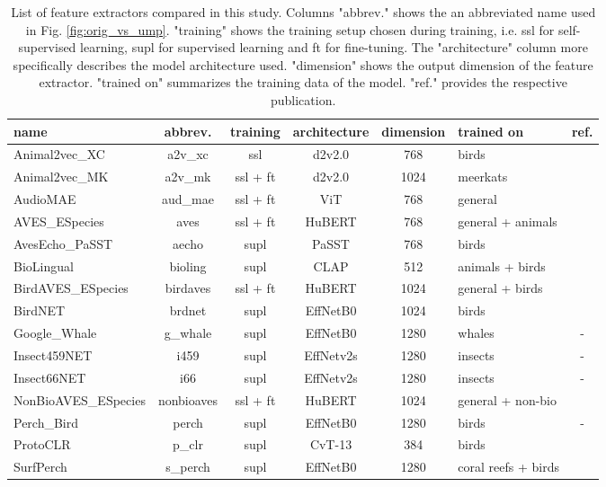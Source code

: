 
\begin{table*}[t]
  
  \caption{List of feature extractors compared in this study. Columns "abbrev." shows the an abbreviated name used in Fig. \ref{fig:orig_vs_ump}. "training" shows the training setup chosen during training, i.e. ssl for self-supervised learning, supl for supervised learning and ft for fine-tuning. The "architecture" column more specifically describes the model architecture used. "dimension" shows the output dimension of the feature extractor. "trained on" summarizes the training data of the model. "ref." provides the respective publication.}
  \label{tab:bacpipe_models}

  \centering
  \begin{tabular}{l|c|c|c|c|l|c}
     \hline
    name& abbrev. & 
    training & architecture &
    dimension & trained on & ref.\\
    \hline
    Animal2vec\_XC      & a2v\_xc   & ssl & d2v2.0 & 768 & birds & \cite{schafer-zimmermann_animal2vec_2024}\\
    Animal2vec\_MK      & a2v\_mk  & ssl + ft & d2v2.0 & 1024& meerkats & \cite{schafer-zimmermann_animal2vec_2024}\\
    AudioMAE            & aud\_mae  & ssl + ft & ViT 	 & 768 & general & \cite{huang_masked_2022}\\
    AVES\_ESpecies      & aves   & ssl + ft & HuBERT 	 & 768 & general + animals & \cite{hagiwara_aves_2022}\\
    AvesEcho\_PaSST     & aecho   & supl & PaSST 	 & 768 & birds & \cite{ghani_generalization_2024}\\
    BioLingual          & bioling  & supl & CLAP 	 & 512 & animals + birds & \cite{robinson_transferable_2023}\\
    BirdAVES\_ESpecies  & birdaves   & ssl + ft & HuBERT 	 & 1024& general + birds & \cite{hagiwara_aves_2022}\\
    BirdNET             & brdnet   & supl & EffNetB0 	 & 1024& birds & \cite{kahl_birdnet_2021}\\
    Google\_Whale       &  g\_whale  & supl & EffNetB0 	 & 1280& whales & - \\
    Insect459NET        & i459 & supl & EffNetv2s 	 & 1280& insects & - \\
    Insect66NET         & i66 & supl & EffNetv2s 	 & 1280& insects & - \\
    NonBioAVES\_ESpecies& nonbioaves    & ssl + ft & HuBERT 	 & 1024& general + non-bio & \cite{hagiwara_aves_2022}\\
    Perch\_Bird         & perch    & supl & EffNetB0 	 & 1280& birds & - \\
    ProtoCLR            & p\_clr   & supl 	 & CvT-13 & 384 & birds & \cite{moummad_domain-invariant_2024}\\
    SurfPerch           &  s\_perch  & supl & EffNetB0 	 & 1280& coral reefs + birds & \cite{williams_leveraging_2024}\\
  \end{tabular}
\end{table*}
